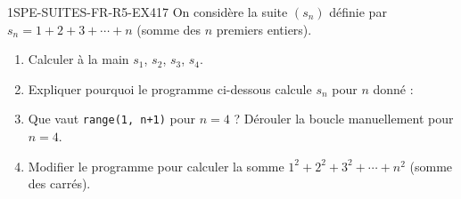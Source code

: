 \begin{exercice}{1SPE-SUITES-FR-R5-EX4}{1}{7}
On considère la suite $(s_n)$ définie par $s_n = 1 + 2 + 3 + \cdots + n$ (somme des $n$ premiers entiers).

\begin{enumerate}
  \item Calculer à la main $s_1$, $s_2$, $s_3$, $s_4$.
  \item Expliquer pourquoi le programme ci-dessous calcule $s_n$ pour $n$ donné :

\medskip


  \item Que vaut \texttt{range(1, n+1)} pour $n = 4$ ? Dérouler la boucle manuellement pour $n = 4$.
  \item Modifier le programme pour calculer la somme $1^2 + 2^2 + 3^2 + \cdots + n^2$ (somme des carrés).
\end{enumerate}
\end{exercice}


